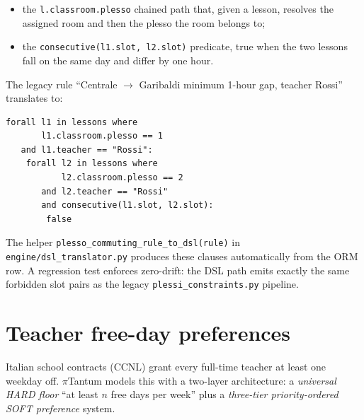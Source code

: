 \begin{itemize}
\item the \texttt{l.classroom.plesso} chained path that, given
  a lesson, resolves the assigned room and then the plesso the
  room belongs to;
\item the \texttt{consecutive(l1.slot, l2.slot)} predicate,
  true when the two lessons fall on the same day and differ
  by one hour.
\end{itemize}

The legacy rule ``Centrale $\to$ Garibaldi minimum 1-hour gap,
teacher Rossi'' translates to:

\begin{lstlisting}
forall l1 in lessons where
       l1.classroom.plesso == 1
   and l1.teacher == "Rossi":
    forall l2 in lessons where
           l2.classroom.plesso == 2
       and l2.teacher == "Rossi"
       and consecutive(l1.slot, l2.slot):
        false
\end{lstlisting}

The helper \texttt{plesso\_commuting\_rule\_to\_dsl(rule)} in
\texttt{engine/dsl\_translator.py} produces these clauses
automatically from the ORM row. A regression test enforces
zero-drift: the DSL path emits exactly the same forbidden slot
pairs as the legacy \texttt{plessi\_constraints.py} pipeline.

\section{Teacher free-day preferences}
\label{sec:vincoli_free_day_en}

Italian school contracts (CCNL) grant every full-time
teacher at least one weekday off. $\pi$Tantum models this
with a two-layer architecture: a \emph{universal HARD floor}
``at least $n$ free days per week'' plus a \emph{three-tier
priority-ordered SOFT preference} system.

